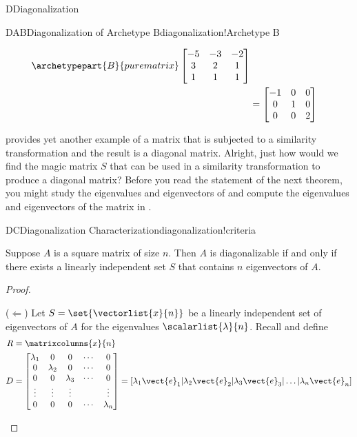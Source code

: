 \begin{subsect}{D}{Diagonalization}
\begin{example}{DAB}{Diagonalization of Archetype B}{diagonalization!Archetype B}
\begin{para}
\begin{align*}
\archetypepart{B}{purematrix}\begin{bmatrix}-5&-3&-2\\3&2&1\\1&1&1\end{bmatrix}\\
%
&=
\begin{bmatrix}-1&0&0\\0&1&0\\0&0&2\end{bmatrix}
%
\end{align*}
\end{para}
%
\end{example}
%
\begin{para} provides yet another example of a matrix that is subjected to a similarity transformation and the result is a diagonal matrix.  Alright, just how would we find the magic matrix $S$ that can be used in a similarity transformation to produce a diagonal matrix?  Before you read the statement of the next theorem, you might study the eigenvalues and eigenvectors of  and compute the eigenvalues and eigenvectors of the matrix in .\end{para}
%
\begin{theorem}{DC}{Diagonalization Characterization}{diagonalization!criteria}
\begin{para}Suppose $A$ is a square matrix of size $n$.  Then $A$ is diagonalizable if and only if there exists a linearly independent set $S$ that contains $n$ eigenvectors of $A$.\end{para}
\end{theorem}
%
\begin{proof}
\begin{para}($\Leftarrow$)  Let $S=\set{\vectorlist{x}{n}}$ be a linearly independent set of eigenvectors of $A$ for the eigenvalues $\scalarlist{\lambda}{n}$.  Recall  and define
%
\begin{align*}
R&=\matrixcolumns{x}{n}\\
D&=
\begin{bmatrix}
\lambda_1 & 0 & 0 &\cdots & 0\\
 0 &\lambda_2 & 0 &\cdots & 0\\
 0 & 0 &\lambda_3 &\cdots & 0\\
 \vdots & \vdots & \vdots & & \vdots\\
 0 & 0 & 0 &\cdots & \lambda_n
\end{bmatrix}
=[\lambda_1\vect{e}_1|\lambda_2\vect{e}_2|\lambda_3\vect{e}_3|\ldots|\lambda_n\vect{e}_n]

\end{align*}
\end{para}
\end{proof}
\end{subsect}

